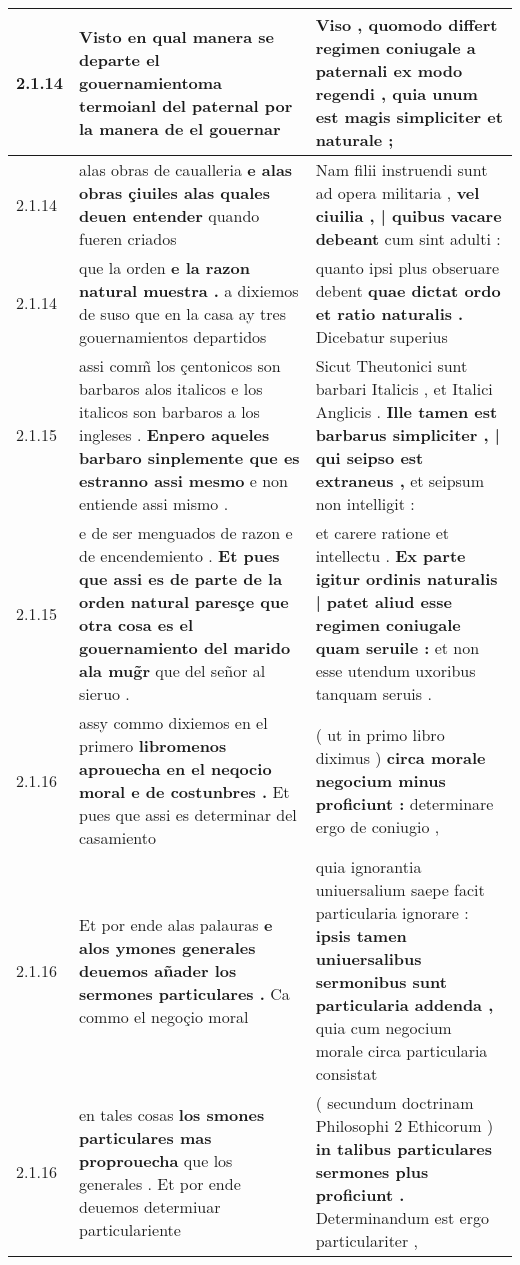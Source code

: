 \begin{tabular}{|p{1cm}|p{6.5cm}|p{6.5cm}|}
2.1.14 & Visto en qual manera se departe el \textbf{ gouernamientoma termoianl del paternal } por la manera de el gouernar & Viso , quomodo differt regimen coniugale \textbf{ a paternali ex modo regendi , } quia unum est magis simpliciter et naturale ; \\\hline
2.1.14 & alas obras de caualleria \textbf{ e alas obras çiuiles alas quales deuen entender } quando fueren criados & Nam filii instruendi sunt ad opera militaria , \textbf{ vel ciuilia , | quibus vacare debeant } cum sint adulti : \\\hline
2.1.14 & que la orden \textbf{ e la razon natural muestra . } a dixiemos de suso que en la casa ay tres gouernamientos departidos & quanto ipsi plus obseruare debent \textbf{ quae dictat ordo et ratio naturalis . } Dicebatur superius \\\hline
2.1.15 & assi comm̃ los çentonicos son barbaros alos italicos e los italicos son barbaros a los ingleses . \textbf{ Enpero aqueles barbaro sinplemente que es estranno assi mesmo } e non entiende assi mismo . & Sicut Theutonici sunt barbari Italicis , et Italici Anglicis . \textbf{ Ille tamen est barbarus simpliciter , | qui seipso est extraneus , } et seipsum non intelligit : \\\hline
2.1.15 & e de ser menguados de razon e de encendemiento . \textbf{ Et pues que assi es de parte de la orden natural paresçe que otra cosa es el gouernamiento del marido ala mug̃r } que del señor al sieruo . & et carere ratione et intellectu . \textbf{ Ex parte igitur ordinis naturalis | patet aliud esse regimen coniugale quam seruile : } et non esse utendum uxoribus tanquam seruis . \\\hline
2.1.16 & assy commo dixiemos en el primero \textbf{ libromenos aprouecha en el neqocio moral e de costunbres . } Et pues que assi es determinar del casamiento & ( ut in primo libro diximus ) \textbf{ circa morale negocium minus proficiunt : } determinare ergo de coniugio , \\\hline
2.1.16 & Et por ende alas palauras \textbf{ e alos ymones generales deuemos añader los sermones particulares . } Ca commo el negoçio moral & quia ignorantia uniuersalium saepe facit particularia ignorare : \textbf{ ipsis tamen uniuersalibus sermonibus sunt particularia addenda , } quia cum negocium morale circa particularia consistat \\\hline
2.1.16 & en tales cosas \textbf{ los smones particulares mas proprouecha } que los generales . Et por ende deuemos determiuar particulariente & ( secundum doctrinam Philosophi 2 Ethicorum ) \textbf{ in talibus particulares sermones plus proficiunt . } Determinandum est ergo particulariter , \\\hline

\end{tabular}
